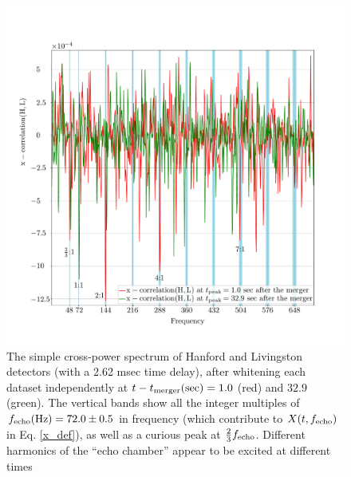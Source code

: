 \documentclass[12pt]{article}
\begin{document}
\begin{enumerate}
\begin{figure}[!tbp]
    \includegraphics[scale=0.5,center]{whitened_peaks.pdf}
 \caption{The simple cross-power spectrum of Hanford and Livingston detectors (with a 2.62 msec time delay), after whitening each dataset independently at $t-t_{\rm merger}({\rm sec}) = 1.0$ (red) and $32.9$ (green). The vertical bands show all the integer multiples of $f_{\rm echo}({\rm Hz}) = 72.0 \pm 0.5$ in frequency (which contribute to $X(t,f_{\rm echo})$ in Eq. \ref{x_def}), as well as a curious peak at $\frac{2}{3} f_{\rm echo}$. Different harmonics of the ``echo chamber'' appear to be excited at different times  }
 \label{whitened}
\end{figure}



\end{enumerate}
\end{document}
